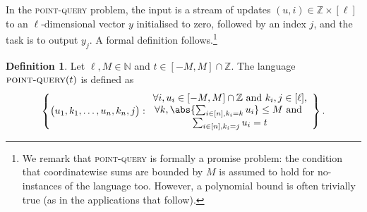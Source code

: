 \documentclass[10pt,a4paper]{article}
\theoremstyle{definition}
\newtheorem{definition}[theorem]{Definition}
\newcommand{\N}{\mathbb N}
\newcommand{\Z}{\mathbb Z}
\renewcommand{\set}[1]{\left\{#1\right\}}
\newcommand{\pointquery}{\normalfont\textsc{point-query}\xspace}
\begin{document}
In the \pointquery problem, the input is a stream of updates $(u, i) \in \Z \times [\ell]$ to an $\ell$-dimensional vector $y$ initialised to zero, followed by an index $j$, and the task is to output $y_j$. A formal definition follows.\footnote{We remark that \pointquery is formally a promise problem: the condition that coordinatewise sums are bounded by $M$ is assumed to hold for no-instances of the language too. However, a polynomial bound is often trivially true (as in the applications that follow).}

\begin{definition}
    \label{def:point-query}
  Let $\ell, M \in \N$ and $t \in [-M, M] \cap \Z$. The language $\pointquery(t)$ is defined as
  \begin{equation*}
      \set{
          \big(u_1, k_1, \ldots, u_n, k_n, j\big)  : \begin{array}{c}
                \forall i, u_i \in [-M, M] \cap \Z \text{ and } k_i, j \in [\ell],\\
                \forall k, \abs{\sum_{i \in [n],  k_i = k} u_i} \leq M \text{ and }\\
                \sum_{i \in [n], k_i = j} u_i = t
          \end{array}
      }.
  \end{equation*}
\end{definition}
\end{document}
